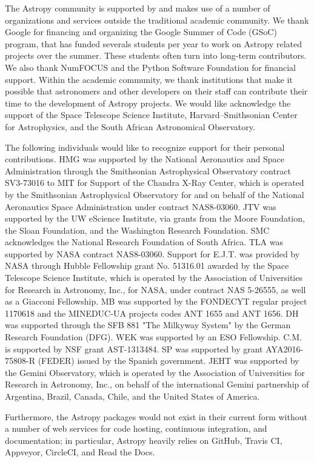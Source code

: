 \documentclass[modern]{aastex61}
\newcommand{\astropy}{Astropy\xspace}
\begin{document}
The \astropy community is supported by and makes use
of a number of organizations and services outside the traditional
academic community. We thank Google for financing and organizing the
Google Summer of Code (GSoC) program, that has funded severals
students per year to work on \astropy related projects over the
summer. These students often turn into long-term contributors. We also
thank NumFOCUS and the Python Software Foundation for financial
support. Within the academic community, we thank
institutions that make it possible that astronomers and other developers on
their staff can contribute their time to the development of
\astropy projects.  We would like acknowledge the support of the 
Space Telescope Science Institute, Harvard–Smithsonian Center for Astrophysics, 
and the South African Astronomical Observatory.  

The following individuals would like to recognize support for their personal contributions.
HMG was supported by the National Aeronautics and Space Administration through the 
Smithsonian Astrophysical Observatory contract SV3-73016 to MIT for Support of the Chandra X-Ray Center, which is
operated by the Smithsonian Astrophysical Observatory for and on behalf of the National Aeronautics Space 
Administration under contract NAS8-03060. JTV was supported by the UW eScience Institute, via grants from the Moore
Foundation, the Sloan Foundation, and the Washington Research Foundation. SMC acknowledges the National Research
Foundation of South Africa. TLA was supported by NASA contract NAS8-03060. Support for E.J.T. was provided by NASA
through Hubble Fellowship grant No. 51316.01 awarded by the Space Telescope Science Institute, which is operated by
the Association of Universities for Research in Astronomy, Inc., for NASA, under contract NAS 5-26555, as well as a 
Giacconi Fellowship. MB was supported by the FONDECYT regular project 1170618 and the MINEDUC-UA projects codes 
ANT 1655 and ANT 1656. DH was supported through the SFB 881 "The Milkyway System" by the German Research Foundation 
(DFG). WEK was supported by an ESO Fellowship. C.M. is supported by NSF grant AST-1313484. SP was supported by 
grant AYA2016-75808-R (FEDER) issued by the Spanish government. JEHT was supported by the Gemini Observatory, which
is operated by the Association of Universities for Research in Astronomy, Inc., on behalf of the international 
Gemini partnership of Argentina, Brazil, Canada, Chile, and the United States of America.


Furthermore, the \astropy packages would not exist
in their current form without a number of web services for code
hosting, continuous integration, and documentation; in particular,
\astropy heavily relies on GitHub, Travis CI, Appveyor, CircleCI, and
Read the Docs.
\end{document}
